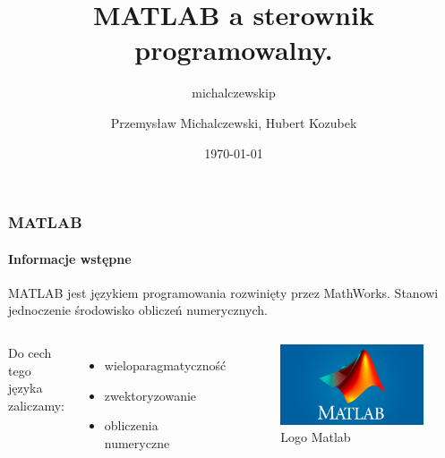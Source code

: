 \documentclass[aspectratio=169]{beamer}
\author{michalczewskip}
\title[PUST]{MATLAB a sterownik programowalny.
}
\author{Przemysław Michalczewski, Hubert Kozubek}
\date{\today}
\begin{document}
\begin{frame}[plain]
\maketitle
\end{frame}





\begin{frame}
\frametitle{MATLAB}
\framesubtitle{Informacje wstępne}

 MATLAB jest językiem programowania rozwinięty przez MathWorks. Stanowi jednoczenie środowisko obliczeń numerycznych.
\newline
\begin{columns} 

Do cech tego języka zaliczamy:

\begin{itemize}
  \item wieloparagmatyczność
  \item zwektoryzowanie
  \item obliczenia numeryczne
\end{itemize}
\begin{figure}
	\includegraphics[width=\linewidth]{Rysunki/MATLAB-Symbol.jpg}
	\caption {Logo Matlab}
\end{figure}


\end{columns}

\end{frame}
\end{document}
